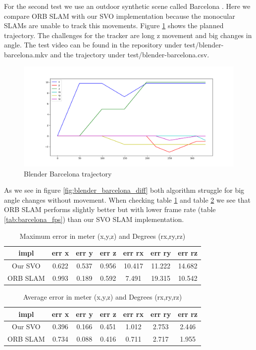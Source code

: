 \documentclass[11pt,a4paper,titlepage,oneside]{report}
\begin{document}
For the second test we use an outdoor synthetic scene called Barcelona \cite{blender}. Here we compare ORB SLAM with our SVO implementation because the monocular SLAMs are unable to track this movements. Figure \ref{fig:blender_barcelona_traj} shows the planned trajectory. The challenges for the tracker are long z movement and big changes in angle. The test video can be found in the repository under test/blender-barcelona.mkv and the trajectory under test/blender-barcelona.csv.

\begin{figure}[H]
  \includegraphics[width=1.0\textwidth]{img/blender_barcelona_traj.png}
  \caption{Blender Barcelona trajectory}\label{fig:blender_barcelona_traj}
\end{figure}

As we see in figure \ref{fig:blender_barcelona_diff} both algorithm struggle for big angle changes without movement. When checking table \ref{tab:barcelona_maximas} and table \ref{tab:barcelona_average} we see that ORB SLAM performs slightly better but with lower frame rate (table \ref{tab:barcelona_fps}) than our SVO SLAM implementation.

\begin{table}[H]
  \centering
  \begin{tabular}{|c|c|c|c|c|c|c|}
  impl & err x & err y & err z & err rx & err ry & err rz\\
  \hline
  Our SVO & 0.622 & 0.537 & 0.956 & 10.417 & 11.222 & 14.682\\
  ORB SLAM& 0.993 & 0.189 & 0.592 & 7.491 & 19.315 & 10.542
\end{tabular}
\caption{Maximum error in meter (x,y,z) and Degrees (rx,ry,rz)}
\label{tab:barcelona_maximas}
\end{table}

\begin{table}[H]
  \centering
  \begin{tabular}{|c|c|c|c|c|c|c|}
    impl & err x & err y & err z & err rx & err ry & err rz\\
    \hline
    Our SVO & 0.396 & 0.166 & 0.451 & 1.012 & 2.753 & 2.446\\
    ORB SLAM & 0.734 & 0.088 & 0.416 & 0.711 & 2.717 & 1.955
  \end{tabular}
\caption{Average error in meter (x,y,z) and Degrees (rx,ry,rz)}
\label{tab:barcelona_average}
\end{table}
\end{document}
